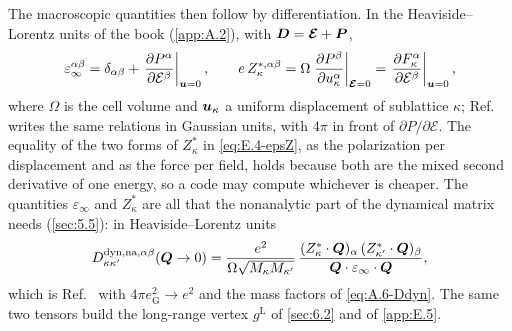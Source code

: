 The macroscopic quantities then follow by differentiation. In the Heaviside--Lorentz units of the book (\cref{app:A.2}), with $\bm{D} = \bm{\mathcal{E}} + \bm{P}$,
\begin{equation}
  \varepsilon_\infty^{\alpha\beta} = \delta_{\alpha\beta} + \left.\frac{\partial P^\alpha}{\partial\mathcal{E}^\beta}\right|_{\bm{u} = 0},
  \qquad
  e\,Z^{*,\alpha\beta}_\kappa = \Omega\left.\frac{\partial P^\beta}{\partial u^\alpha_\kappa}\right|_{\bm{\mathcal{E}} = 0}
  = \left.\frac{\partial F^\alpha_\kappa}{\partial\mathcal{E}^\beta}\right|_{\bm{u} = 0} ,
  \label{eq:E.4-epsZ}
\end{equation}
where $\Omega$ is the cell volume and $\bm{u}_\kappa$ a uniform displacement of sublattice $\kappa$; Ref.~\cite[Eqs.~(94)--(96)]{baroni2001phonons} writes the same relations in Gaussian units, with $4\pi$ in front of $\partial P/\partial\mathcal{E}$. The equality of the two forms of $Z^*_\kappa$ in \cref{eq:E.4-epsZ}, as the polarization per displacement and as the force per field, holds because both are the mixed second derivative of one energy, so a code may compute whichever is cheaper. The quantities $\varepsilon_\infty$ and $Z^*_\kappa$ are all that the nonanalytic part of the dynamical matrix needs (\cref{sec:5.5}): in Heaviside--Lorentz units
\begin{equation}
  D^{\mathrm{dyn,na},\alpha\beta}_{\kappa\kappa'}(\bm{Q}\to 0) = \frac{e^2}{\Omega\sqrt{M_\kappa M_{\kappa'}}}\,
  \frac{(Z^*_\kappa\cdot\bm{Q})_\alpha\,(Z^*_{\kappa'}\cdot\bm{Q})_\beta}{\bm{Q}\cdot\varepsilon_\infty\cdot\bm{Q}} ,
  \label{eq:E.4-na}
\end{equation}
which is Ref.~\cite[Eq.~(98)]{baroni2001phonons} with $4\pi e^2_{\mathrm{G}} \to e^2$ and the mass factors of \cref{eq:A.6-Ddyn}. The same two tensors build the long-range vertex $g^{\mathrm{L}}$ of \cref{sec:6.2} and of \cref{app:E.5}.

